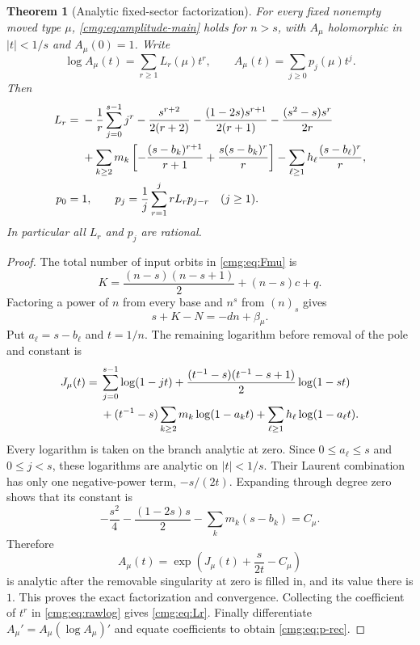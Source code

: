 \documentclass[11pt,letterpaper]{article}
\numberwithin{equation}{section}
\newtheorem{theorem}{Theorem}[section]
\theoremstyle{definition}\newtheorem{definition}[theorem]{Definition}
\theoremstyle{remark}\newtheorem{remark}[theorem]{Remark}
\begin{document}
\begin{theorem}[Analytic fixed-sector factorization]\label{cmg:thm:analytic}
For every fixed nonempty moved type $\mu$, \eqref{cmg:eq:amplitude-main} holds for $n>s$, with $A_\mu$ holomorphic in $|t|<1/s$ and $A_\mu(0)=1$. Write
\[
 \log A_\mu(t)=\sum_{r\ge1}L_r(\mu)t^r,\qquad
 A_\mu(t)=\sum_{j\ge0}p_j(\mu)t^j.
\]
Then
\begin{align}\label{cmg:eq:Lr}
 L_r={}&-\frac1r\sum_{j=0}^{s-1}j^r
 -\frac{s^{r+2}}{2(r+2)}
 -\frac{(1-2s)s^{r+1}}{2(r+1)}
 -\frac{(s^2-s)s^r}{2r}\notag\\
 &+\sum_{k\ge2}m_k\left[-\frac{(s-b_k)^{r+1}}{r+1}
                         +\frac{s(s-b_k)^r}{r}\right]
 -\sum_{\ell\ge1}h_\ell\frac{(s-b_\ell)^r}{r},\\
 p_0={}&1,\qquad
 p_j=\frac1j\sum_{r=1}^j rL_r p_{j-r}\quad(j\ge1).\label{cmg:eq:p-rec}
\end{align}
In particular all $L_r$ and $p_j$ are rational.
\end{theorem}
\begin{proof}
The total number of input orbits in \eqref{cmg:eq:Fmu} is
\[
 K=\frac{(n-s)(n-s+1)}2+(n-s)c+q.
\]
Factoring a power of $n$ from every base and $n^s$ from $(n)_s$ gives
\[
 s+K-N=-dn+\beta_\mu.
\]
Put $a_\ell=s-b_\ell$ and $t=1/n$. The remaining logarithm before removal of the pole and constant is
\begin{align}\label{cmg:eq:rawlog}
 J_\mu(t)={}&\sum_{j=0}^{s-1}\log(1-jt)
 +\frac{(t^{-1}-s)(t^{-1}-s+1)}2\log(1-st)\notag\\
 &+(t^{-1}-s)\sum_{k\ge2}m_k\log(1-a_k t)
 +\sum_{\ell\ge1}h_\ell\log(1-a_\ell t).
\end{align}
Every logarithm is taken on the branch analytic at zero. Since $0\le a_\ell\le s$ and $0\le j<s$, these logarithms are analytic on $|t|<1/s$. Their Laurent combination has only one negative-power term, $-s/(2t)$. Expanding through degree zero shows that its constant is
\[
 -\frac{s^2}4-\frac{(1-2s)s}{2}-\sum_km_k(s-b_k)=C_\mu.
\]
Therefore
\begin{equation}\label{cmg:eq:Adefinition}
 A_\mu(t)=\exp\left(J_\mu(t)+\frac{s}{2t}-C_\mu\right)
\end{equation}
is analytic after the removable singularity at zero is filled in, and its value there is $1$. This proves the exact factorization and convergence. Collecting the coefficient of $t^r$ in \eqref{cmg:eq:rawlog} gives \eqref{cmg:eq:Lr}. Finally differentiate $A_\mu'=A_\mu(\log A_\mu)'$ and equate coefficients to obtain \eqref{cmg:eq:p-rec}.
\end{proof}
\end{document}
